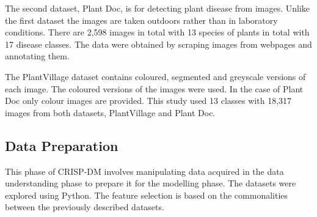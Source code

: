 \documentclass[conference]{IEEEtran}
\begin{document}
The second dataset, Plant Doc\cite{kaggledatasetPlantDoc}, is for detecting plant disease from images. Unlike the first dataset the images are taken outdoors rather than in laboratory conditions. There are 2,598 images in total with 13 species of plants in total with 17 disease classes. The data were obtained by scraping images from webpages and annotating them. 

The PlantVillage dataset contains coloured, segmented and greyscale versions of each image. The coloured versions of the images were used. In the case of Plant Doc only colour images are provided. This study used 13 classes with 18,317 images from both datasets, PlantVillage and Plant Doc.  
\subsection{Data Preparation}
This phase of CRISP-DM involves manipulating data acquired in the data understanding phase to prepare it for the modelling phase. The datasets were explored using Python. The feature selection is based on the commonalities between the previously described datasets. \
\end{document}

